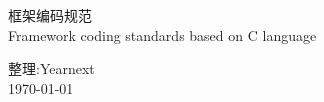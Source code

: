 \documentclass[UTF8,a4paper,12pt]{article}
\begin{document}
	\begin{center}
		\large 框架编码规范\\
		\large Framework coding standards based on C language
		\newline
		\newline
		\newline
		\newline
		\newline
		\newline
		\newline
		\newline
		\newline
		\newline
		\newline
		\newline
		\newline
		\newline
		\newline
		\newline
		\newline
		\newline
		\newline
	\end{center}

	\begin{center}
		\large 整理:Yearnext 
		\\
		\large \today
	\end{center}
	\newpage
	
	\tableofcontents
	\listoffigures
	\listoftables%
	\newpage
	
	 \newpage
	 \newpage
	 \newpage
	 \newpage
	 \newpage
	 \newpage
	 \newpage
	 \newpage
	 \newpage
	 \newpage
	 \newpage
	 \newpage
\end{document}
